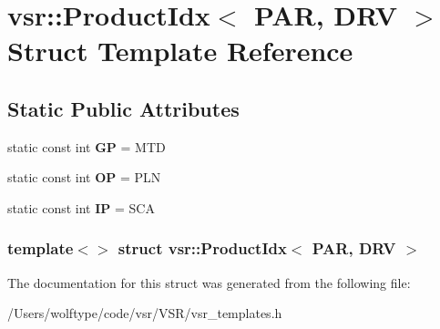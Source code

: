\hypertarget{structvsr_1_1_product_idx_3_01_p_a_r_00_01_d_r_v_01_4}{\section{vsr\-:\-:Product\-Idx$<$ P\-A\-R, D\-R\-V $>$ Struct Template Reference}
\label{structvsr_1_1_product_idx_3_01_p_a_r_00_01_d_r_v_01_4}
}
\subsection*{Static Public Attributes}
\begin{DoxyCompactItemize}
\item 
\hypertarget{structvsr_1_1_product_idx_3_01_p_a_r_00_01_d_r_v_01_4_a4c4411923a2f03ff6cb2fa7d1920fc7c}{static const int {\bfseries G\-P} = M\-T\-D}\label{structvsr_1_1_product_idx_3_01_p_a_r_00_01_d_r_v_01_4_a4c4411923a2f03ff6cb2fa7d1920fc7c}

\item 
\hypertarget{structvsr_1_1_product_idx_3_01_p_a_r_00_01_d_r_v_01_4_af64033e23ef6b4e437b3df874fdb93e4}{static const int {\bfseries O\-P} = P\-L\-N}\label{structvsr_1_1_product_idx_3_01_p_a_r_00_01_d_r_v_01_4_af64033e23ef6b4e437b3df874fdb93e4}

\item 
\hypertarget{structvsr_1_1_product_idx_3_01_p_a_r_00_01_d_r_v_01_4_a6c92843fdda6f84313f9ce1f03a29d56}{static const int {\bfseries I\-P} = S\-C\-A}\label{structvsr_1_1_product_idx_3_01_p_a_r_00_01_d_r_v_01_4_a6c92843fdda6f84313f9ce1f03a29d56}

\end{DoxyCompactItemize}
\subsubsection*{template$<$$>$ struct vsr\-::\-Product\-Idx$<$ P\-A\-R, D\-R\-V $>$}



The documentation for this struct was generated from the following file\-:\begin{DoxyCompactItemize}
\item 
/\-Users/wolftype/code/vsr/\-V\-S\-R/vsr\-\_\-templates.\-h\end{DoxyCompactItemize}

